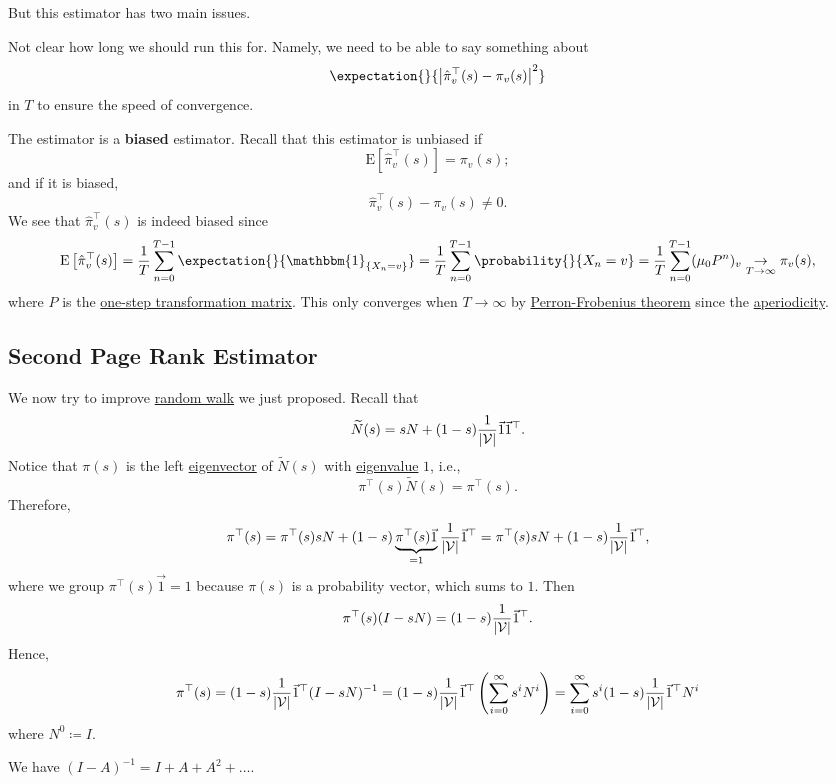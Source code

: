But this estimator has two main issues.
\begin{problem}
Not clear how long we should run this for. Namely, we need to be able to say something about
\[
	\expectation{}{\left\vert \hat{\pi}^{\top}_v(s) - \pi_v(s) \right\vert^2 }
\]
in \(T\) to ensure the speed of convergence.
\end{problem}

\begin{problem}[Biased]
The estimator is a \textbf{biased} estimator. Recall that this estimator is unbiased if
\[
	\mathrm{E}\left[ \hat{\pi}_{v}^{\top}(s) \right] = \pi_v(s);
\]
and if it is biased,
\[
	\hat{\pi}_{v}^{\top}(s) - \pi_v(s)\neq 0.
\]
We see that \(\hat{\pi}^{\top}_v(s)\) is indeed biased since
\[
	\mathrm{E}\left[\hat{\pi}^{\top}_v(s)\right] = \frac{1}{T}\sum\limits_{n=0}^{T-1} \expectation{}{\mathbbm{1}_{\{X_n = v\}}}
	= \frac{1}{T}\sum\limits_{n=0}^{T-1} \probability{}{X_n = v}
	= \frac{1}{T}\sum\limits_{n=0}^{T-1} (\mu_0 P^n)_v\underset{T\to \infty }{\to }\pi_v(s),
\]
where \(P\) is the \underline{one-step transformation matrix}. This only converges when \(T\to \infty \) by
\hyperref[thm:Perron-Frobenius-theorem]{Perron-Frobenius theorem} since the \hyperref[def:aperiodic]{aperiodicity}.
\end{problem}

\subsection{Second Page Rank Estimator}\label{subsec:second-page-rank-estimator}
We now try to improve \hyperref[algo:random-walk-algorithm]{random walk} we just proposed. Recall that
\[
	\widetilde{N}(s) = sN+(1-s)\frac{1}{\left\vert \mathcal{\MakeUppercase{v}}  \right\vert }\vec{1}\vec{1}^{\top}.
\]
Notice that \(\pi(s)\) is the left \hyperref[def:eigenvector]{eigenvector} of \(\widetilde{N}(s)\) with \hyperref[def:eigenvalue]{eigenvalue} \(1\), i.e.,
\[
	\pi^{\top}(s)\widetilde{N}(s) = \pi^{\top}(s).
\]
Therefore,
\[
	\pi ^{\top} (s)
	= \pi^{\top}(s)sN+(1 - s)\underbrace{\pi^{\top}(s)\vec{1}}_{ = 1}\frac{1}{\left\vert \mathcal{\MakeUppercase{v}}\right\vert}\vec{1}^{\top}
	= \pi^{\top}(s)sN+(1 - s)\frac{1}{\left\vert \mathcal{\MakeUppercase{v}}  \right\vert}\vec{1}^{\top},
\]
where we group \(\pi^{\top}(s)\vec{1} = 1\) because \(\pi(s)\) is a probability vector, which sums to \(1\). Then
\[
	\pi^{\top}(s)(I - sN) = (1 - s)\frac{1}{\left\vert \mathcal{\MakeUppercase{v}}  \right\vert}\vec{1}^{\top}.
\]
Hence,
\[
	\pi^{\top}(s) = (1 - s)\frac{1}{\left\vert \mathcal{\MakeUppercase{v}}  \right\vert}\vec{1}^{\top}(I - sN)^{-1}
	= (1 - s)\frac{1}{\left\vert \mathcal{\MakeUppercase{v}}  \right\vert}\vec{1}^{\top}\left(\sum\limits_{i=0}^{\infty} s^i N^i\right)
	= \sum\limits_{i=0}^{\infty} s^i (1 - s)\frac{1}{\left\vert \mathcal{\MakeUppercase{v}}  \right\vert}\vec{1}^{\top}N^i
\]
where \(N^0\coloneqq I\).
\begin{prev}
	We have \((I - A)^{-1} = I + A + A^2 + \ldots\).
\end{prev}

